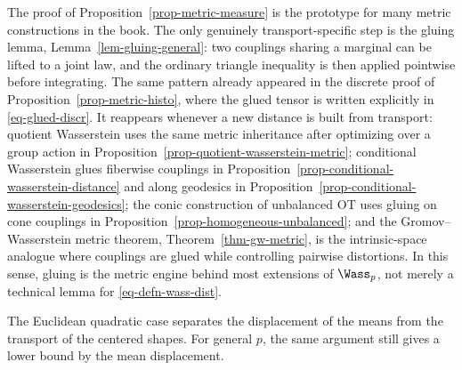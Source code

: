 \begin{rem}\label{rem-gluing-metric-engine}
	The proof of Proposition~\ref{prop-metric-measure} is the prototype for many metric constructions in the book. The only genuinely transport-specific step is the gluing lemma, Lemma~\ref{lem-gluing-general}: two couplings sharing a marginal can be lifted to a joint law, and the ordinary triangle inequality is then applied pointwise before integrating. The same pattern already appeared in the discrete proof of Proposition~\ref{prop-metric-histo}, where the glued tensor is written explicitly in \eqref{eq-glued-discr}. It reappears whenever a new distance is built from transport: quotient Wasserstein uses the same metric inheritance after optimizing over a group action in Proposition~\ref{prop-quotient-wasserstein-metric}; conditional Wasserstein glues fiberwise couplings in Proposition~\ref{prop-conditional-wasserstein-distance} and along geodesics in Proposition~\ref{prop-conditional-wasserstein-geodesics}; the conic construction of unbalanced OT uses gluing on cone couplings in Proposition~\ref{prop-homogeneous-unbalanced}; and the Gromov--Wasserstein metric theorem, Theorem~\ref{thm-gw-metric}, is the intrinsic-space analogue where couplings are glued while controlling pairwise distortions. In this sense, gluing is the metric engine behind most extensions of \(\Wass_p\), not merely a technical lemma for \eqref{eq-defn-wass-dist}.
\end{rem}

The Euclidean quadratic case separates the displacement of the means from the transport of the centered shapes. For general $p$, the same argument still gives a lower bound by the mean displacement.

